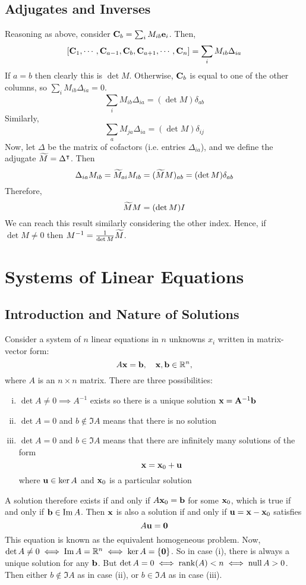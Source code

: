 \documentclass{article}
\begin{document}
\subsection{Adjugates and Inverses}
Reasoning as above, consider $\vb C_b = \sum_i M_{ib} \vb e_i$. Then,
\[ [\vb C_1, \cdots, \vb C_{a-1}, \vb C_b, \vb C_{a+1}, \cdots, \vb C_n ] = \sum_i M_{ib} \Delta_{ia} \]
If $a=b$ then clearly this is $\det M$. Otherwise, $\vb C_b$ is equal to one of the other columns, so $\sum_i M_{ib} \Delta_{ia} = 0$.
\[ \sum_i M_{ib} \Delta_{ia} = (\det M)\delta_{ab} \]
Similarly,
\[ \sum_a M_{ja} \Delta_{ia} = (\det M)\delta_{ij} \]
Now, let $\Delta$ be the matrix of cofactors (i.e. entries $\Delta_{ia}$), and we define the adjugate $\widetilde{M} = \Delta^\intercal$. Then
\[ \Delta_{ia}M_{ib} = \widetilde{M}_{ai}M_{ib} = (\widetilde{M} M)_{ab} = (\det M)\delta_{ab} \]
Therefore,
\[ \widetilde{M} M = (\det M) I \]
We can reach this result similarly considering the other index. Hence, if $\det M \neq 0$ then $M^{-1} = \frac{1}{\det M}\widetilde{M}$.

\section{Systems of Linear Equations}
\subsection{Introduction and Nature of Solutions}
Consider a system of $n$ linear equations in $n$ unknowns $x_i$ written in matrix-vector form:
\[ A\vb x = \vb b,\quad \vb x, \vb b \in \mathbb R^n, \]
where $A$ is an $n \times n$ matrix. There are three possibilities:
\begin{enumerate}[(i)]
	\item $\det A \neq 0 \implies A^{-1}$ exists so there is a unique solution $\vb x = \vb A^{-1} \vb b$
	\item $\det A = 0$ and $b \notin \Im A$ means that there is no solution
	\item $\det A = 0$ and $b \in \Im A$ means that there are infinitely many solutions of the form
	      \[ \vb x = \vb x_0 + \vb u \]
	      where $\vb u \in \ker A$ and $\vb x_0$ is a particular solution
\end{enumerate}
A solution therefore exists if and only if $A\vb x_0 = \vb b$ for some $\vb x_0$, which is true if and only if $\vb b \in \Im A$. Then $\vb x$ is also a solution if and only if $\vb u = \vb x - \vb x_0$ satisfies
\[ A\vb u = \vb 0 \]
This equation is known as the equivalent homogeneous problem. Now, $\det A \neq 0 \iff \Im A = \mathbb R^n \iff \ker A = \{ \vb 0 \}$. So in case (i), there is always a unique solution for any $\vb b$. But $\det A = 0 \iff \rank(A) < n \iff \operatorname{null} A > 0$. Then either $b \notin \Im A$ as in case (ii), or $b \in \Im A$ as in case (iii).
\end{document}
